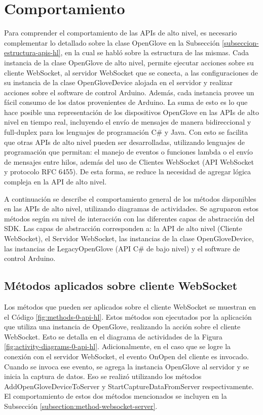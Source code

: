 \section{Comportamiento}
\label{seccion-comportamiento-apis}
Para comprender el comportamiento de las APIs de alto nivel, es necesario complementar lo detallado sobre la clase OpenGlove en la Subsección \ref{subseccion-estructura-apis-hl}, en la cual se habló sobre la estructura de las mismas. Cada instancia de la clase OpenGlove de alto nivel, permite ejecutar acciones sobre su cliente WebSocket, al servidor WebSocket que se conecta, a las configuraciones de su instancia de la clase OpenGloveDevice alojada en el servidor y realizar acciones sobre el software de control Arduino. Además, cada instancia provee un fácil consumo de los datos provenientes de Arduino. La suma de esto es lo que hace posible una representación de los dispositivos OpenGlove en las APIs de alto nivel en tiempo real, incluyendo el envío de mensajes de manera bidireccional y full-duplex para los lenguajes de programación C\# y Java. Con esto se facilita que otras APIs de alto nivel pueden ser desarrolladas, utilizando lenguajes de programación que permitan: el manejo de eventos o funciones lambda o el envío de mensajes entre hilos, además del uso de Clientes WebSocket (API WebSocket y protocolo RFC 6455). De esta forma, se reduce la necesidad de agregar lógica compleja en la API de alto nivel.

A continuación se describe el comportamiento general de los métodos disponibles en las APIs de alto nivel, utilizando diagramas de actividades. Se agruparon estos métodos según su nivel de interacción con las diferentes capas de abstracción del SDK. Las capas de abstracción corresponden a: la API de alto nivel (Cliente WebSocket), el Servidor WebSocket, las instancias de la clase OpenGloveDevice, las instancias de LegacyOpenGlove (API C\# de bajo nivel) y el software de control Arduino.



\subsection{Métodos aplicados sobre cliente WebSocket}
\label{subsection:method-websocket-client}

Los métodos que pueden ser aplicados sobre el cliente WebSocket se muestran en el Código \ref{fig:methods-0-api-hl}. Estos métodos son ejecutados por la aplicación que utiliza una instancia de OpenGlove, realizando la acción sobre el cliente WebSocket. Esto se detalla en el diagrama de actividades de la Figura \ref{fig:activity-diagrams-0-api-hl}. Adicionalmente, en el caso que se logre la conexión con el servidor WebSocket, el evento OnOpen del cliente es invocado. Cuando se invoca ese evento, se agrega la instancia OpenGlove al servidor  y se inicia la captura de datos. Eso se realizó utilizando los métodos AddOpenGloveDeviceToServer y StartCaptureDataFromServer respectivamente. El comportamiento de estos dos métodos mencionados se incluyen en la Subsección \ref{subsection:method-websocket-server}.


